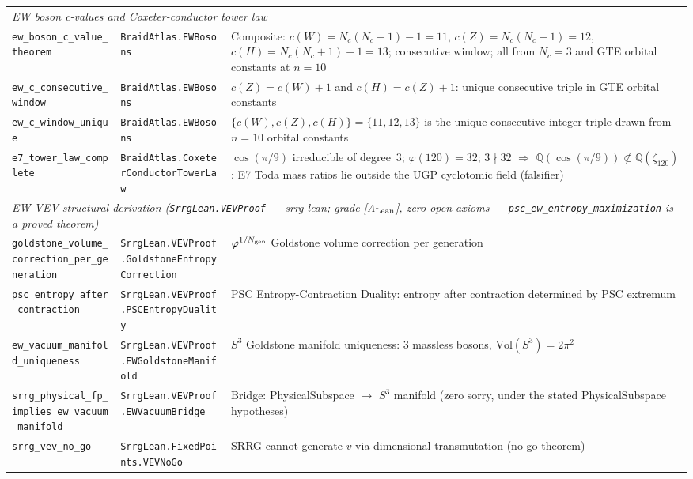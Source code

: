 \documentclass[10pt]{article}
\begin{document}
\begin{longtable}{@{} p{3.8cm} p{4.8cm} p{4.8cm} @{}}
\multicolumn{3}{l}{\textit{EW boson c-values and Coxeter-conductor tower law}} \\[2pt]
\nolinkurl{ew_boson_c_value_theorem} & \nolinkurl{BraidAtlas.EWBosons} & Composite: $c(W)=N_c(N_c{+}1){-}1=11$, $c(Z)=N_c(N_c{+}1)=12$, $c(H)=N_c(N_c{+}1){+}1=13$; consecutive window; all from $N_c=3$ and GTE orbital constants at $n=10$ \\
\nolinkurl{ew_c_consecutive_window} & \nolinkurl{BraidAtlas.EWBosons} & $c(Z)=c(W)+1$ and $c(H)=c(Z)+1$: unique consecutive triple in GTE orbital constants \\
\nolinkurl{ew_c_window_unique} & \nolinkurl{BraidAtlas.EWBosons} & $\{c(W),c(Z),c(H)\}=\{11,12,13\}$ is the unique consecutive integer triple drawn from $n=10$ orbital constants \\
\nolinkurl{e7_tower_law_complete} & \nolinkurl{BraidAtlas.CoxeterConductorTowerLaw} & $\cos(\pi/9)$ irreducible of degree~3; $\varphi(120)=32$; $3\nmid 32$ $\Rightarrow$ $\mathbb{Q}(\cos(\pi/9))\not\subset\mathbb{Q}(\zeta_{120})$: E7 Toda mass ratios lie outside the UGP cyclotomic field (falsifier) \\[4pt]

\multicolumn{3}{l}{\textit{EW VEV structural derivation (\texttt{SrrgLean.VEVProof} --- srrg-lean; grade [A$_{\rm Lean}$], zero open axioms --- \texttt{psc\_ew\_entropy\_maximization} is a proved theorem)}} \\[2pt]
\nolinkurl{goldstone_volume_correction_per_generation} & \nolinkurl{SrrgLean.VEVProof.GoldstoneEntropyCorrection} & $\varphi^{1/N_{\rm gen}}$ Goldstone volume correction per generation \\
\nolinkurl{psc_entropy_after_contraction} & \nolinkurl{SrrgLean.VEVProof.PSCEntropyDuality} & PSC Entropy-Contraction Duality: entropy after contraction determined by PSC extremum \\
\nolinkurl{ew_vacuum_manifold_uniqueness} & \nolinkurl{SrrgLean.VEVProof.EWGoldstoneManifold} & $S^3$ Goldstone manifold uniqueness: 3 massless bosons, $\mathrm{Vol}(S^3) = 2\pi^2$ \\
\nolinkurl{srrg_physical_fp_implies_ew_vacuum_manifold} & \nolinkurl{SrrgLean.VEVProof.EWVacuumBridge} & Bridge: PhysicalSubspace $\to$ $S^3$ manifold (zero sorry, under the stated PhysicalSubspace hypotheses) \\
\nolinkurl{srrg_vev_no_go} & \nolinkurl{SrrgLean.FixedPoints.VEVNoGo} & SRRG cannot generate $v$ via dimensional transmutation (no-go theorem) \\[4pt]


\end{longtable}
\end{document}
